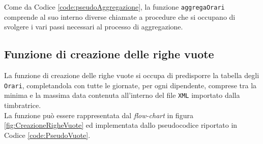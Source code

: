 
\noindent
Come da Codice \ref{code:pseudoAggregazione}, la funzione \verb|aggregaOrari| comprende al suo interno diverse chiamate a procedure che si occupano di svolgere i vari passi necessari al processo di aggregazione.
\subsection{Funzione di creazione delle righe vuote}
La funzione di creazione delle righe vuote si occupa di predisporre la tabella degli \verb|Orari|, completandola con tutte le giornate, per ogni dipendente, comprese tra la minima e la massima data contenuta all'interno del file \verb|XML| importato dalla timbratrice.\\

\noindent
La funzione può essere rappresentata dal \textit{flow-chart} in figura \ref{fig:CreazioneRigheVuote} ed implementata dallo pseudocodice riportato in Codice \ref{code:PseudoVuote}.




